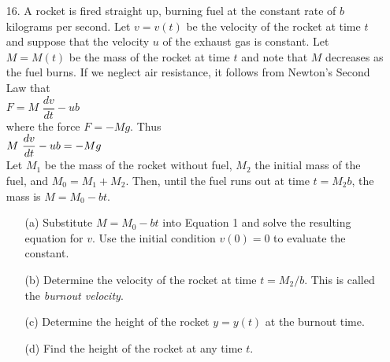 \documentclass{sebase}
\begin{document}
\begin{enumerate}
\item[16.] A rocket is fired straight up, burning fuel at the constant rate
of $b$ kilograms per second. Let $v=v(t)$ be the velocity of the rocket at
time $t$ and suppose that the velocity $u$ of the exhaust gas is constant.
Let $M=M(t)$ be the mass of the rocket at time $t$ and note that $M$
decreases as the fuel burns. If we neglect air resistance, it follows from
Newton's Second Law that \\[4pt]
\hspace*{\fill}$F=M\,\,\dfrac{dv}{dt}-ub$\hspace*{\fill}\\[4pt]
where the force $F=-Mg$. Thus\\[4pt]
$\hspace*{\fill}M\,\,\dfrac{dv}{dt}-ub=-Mg\hspace*{\fill}$%
\\[4pt]
Let $M_{1}$ be the mass of the rocket without fuel, $M_{2}$ the initial mass
of the fuel, and $M_{0}=M_{1}+M_{2}$. Then, until the fuel runs out at time $%
t=M_{2}b$, the mass is $M=M_{0}-bt$.

\begin{enumerate}
\item[(a)] Substitute $M=M_{0}-bt$ into Equation 1 and solve the resulting
equation for $v$. Use the initial condition $v(0)=0$ to evaluate the
constant.

%

\item[(b)] Determine the velocity of the rocket at time $t=M_{2}/b$. This is
called the \textit{burnout velocity}.

%

\item[(c)] Determine the height of the rocket $y=y(t)$ at the burnout time.

%

\item[(d)] Find the height of the rocket at any time $t$.

%
\end{enumerate}
\end{enumerate}
\end{document}
